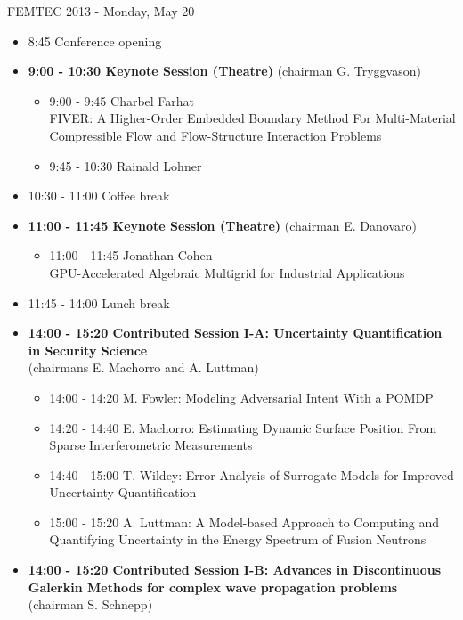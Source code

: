 \documentclass[10pt, A4]{article}%
\begin{document}
\centerline{\huge FEMTEC 2013 - Monday, May 20}
\vspace{4mm}

\begin{itemize}    
  \item 8:45 Conference opening
  \item {\bf 9:00 - 10:30 Keynote Session (Theatre)} (chairman G. Tryggvason) 
  \begin{itemize}
    \item 9:00 - 9:45 {Charbel Farhat}\\{FIVER: A Higher-Order Embedded Boundary Method For Multi-Material Compressible Flow and Flow-Structure Interaction Problems}
    \item 9:45 - 10:30 {Rainald Lohner}
  \end{itemize}
  \item 10:30 - 11:00 Coffee break
  \item {\bf 11:00 - 11:45 Keynote Session (Theatre)} (chairman E. Danovaro) 
  \begin{itemize}
    \item 11:00 - 11:45 {Jonathan Cohen}\\{GPU-Accelerated Algebraic Multigrid for Industrial Applications}
  \end{itemize}
  \item 11:45 - 14:00 Lunch break      
  \item {\bf 14:00 - 15:20 Contributed Session I-A: Uncertainty Quantification in Security Science} \\(chairmans E. Machorro and A. Luttman) 
  \begin{itemize}
    \item 14:00 - 14:20 {M. Fowler}: {Modeling Adversarial Intent With a POMDP}
    \item 14:20 - 14:40 {E. Machorro}: {Estimating Dynamic Surface Position From Sparse Interferometric Measurements}
    \item 14:40 - 15:00 {T. Wildey}: {Error Analysis of Surrogate Models for Improved Uncertainty Quantification}
    \item 15:00 - 15:20 {A. Luttman}: {A Model-based Approach to Computing and Quantifying Uncertainty in the Energy Spectrum of Fusion Neutrons}
  \end{itemize}
  \item {\bf 14:00 - 15:20 Contributed Session I-B: Advances in Discontinuous Galerkin Methods for complex wave propagation problems} (chairman S. Schnepp)
  \begin{itemize}

\end{itemize}
\end{itemize}
\end{document}
